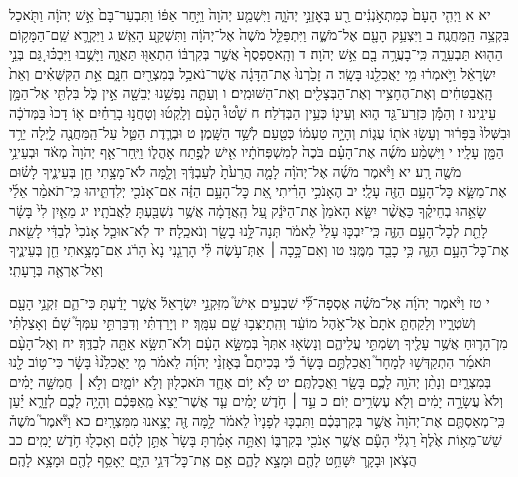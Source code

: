 \documentclass[twoside, openany, parskip=half, 11pt]{book}
\begin{document}
יא א וַיְהִ֤י הָעָם֙ כְּמִתְאֹ֣נְנִ֔ים רַ֖ע בְּאׇזְנֵ֣י יְהֹוָ֑ה וַיִּשְׁמַ֤ע יְהֹוָה֙ וַיִּ֣חַר אַפּ֔וֹ וַתִּבְעַר־בָּם֙ אֵ֣שׁ יְהֹוָ֔ה וַתֹּ֖אכַל בִּקְצֵ֥ה הַֽמַּחֲנֶֽה׃ ב וַיִּצְעַ֥ק הָעָ֖ם אֶל־מֹשֶׁ֑ה וַיִּתְפַּלֵּ֤ל מֹשֶׁה֙ אֶל־יְהֹוָ֔ה וַתִּשְׁקַ֖ע הָאֵֽשׁ׃ ג וַיִּקְרָ֛א שֵֽׁם־הַמָּק֥וֹם הַה֖וּא תַּבְעֵרָ֑ה כִּֽי־בָעֲרָ֥ה בָ֖ם אֵ֥שׁ יְהֹוָה׃ ד וְהָֽאסַפְסֻף֙ אֲשֶׁ֣ר בְּקִרְבּ֔וֹ הִתְאַוּ֖וּ תַּאֲוָ֑ה וַיָּשֻׁ֣בוּ וַיִּבְכּ֗וּ גַּ֚ם בְּנֵ֣י יִשְׂרָאֵ֔ל וַיֹּ֣אמְר֔וּ מִ֥י יַאֲכִלֵ֖נוּ בָּשָֽׂר׃ ה זָכַ֙רְנוּ֙ אֶת־הַדָּגָ֔ה אֲשֶׁר־נֹאכַ֥ל בְּמִצְרַ֖יִם חִנָּ֑ם אֵ֣ת הַקִּשֻּׁאִ֗ים וְאֵת֙ הָֽאֲבַטִּחִ֔ים וְאֶת־הֶחָצִ֥יר וְאֶת־הַבְּצָלִ֖ים וְאֶת־הַשּׁוּמִֽים׃ ו וְעַתָּ֛ה נַפְשֵׁ֥נוּ יְבֵשָׁ֖ה אֵ֣ין כֹּ֑ל בִּלְתִּ֖י אֶל־הַמָּ֥ן עֵינֵֽינוּ׃ ז וְהַמָּ֕ן כִּזְרַע־גַּ֖ד ה֑וּא וְעֵינ֖וֹ כְּעֵ֥ין הַבְּדֹֽלַח׃ ח שָׁ֩טוּ֩ הָעָ֨ם וְלָֽקְט֜וּ וְטָחֲנ֣וּ בָרֵחַ֗יִם א֤וֹ דָכוּ֙ בַּמְּדֹכָ֔ה וּבִשְּׁלוּ֙ בַּפָּר֔וּר וְעָשׂ֥וּ אֹת֖וֹ עֻג֑וֹת וְהָיָ֣ה טַעְמ֔וֹ כְּטַ֖עַם לְשַׁ֥ד הַשָּֽׁמֶן׃ ט וּבְרֶ֧דֶת הַטַּ֛ל עַל־הַֽמַּחֲנֶ֖ה לָ֑יְלָה יֵרֵ֥ד הַמָּ֖ן עָלָֽיו׃ י וַיִּשְׁמַ֨ע מֹשֶׁ֜ה אֶת־הָעָ֗ם בֹּכֶה֙ לְמִשְׁפְּחֹתָ֔יו אִ֖ישׁ לְפֶ֣תַח אׇהֳל֑וֹ וַיִּֽחַר־אַ֤ף יְהֹוָה֙ מְאֹ֔ד וּבְעֵינֵ֥י מֹשֶׁ֖ה רָֽע׃ יא וַיֹּ֨אמֶר מֹשֶׁ֜ה אֶל־יְהֹוָ֗ה לָמָ֤ה הֲרֵעֹ֙תָ֙ לְעַבְדֶּ֔ךָ וְלָ֛מָּה לֹא־מָצָ֥תִי חֵ֖ן בְּעֵינֶ֑יךָ לָשׂ֗וּם אֶת־מַשָּׂ֛א כׇּל־הָעָ֥ם הַזֶּ֖ה עָלָֽי׃ יב הֶאָנֹכִ֣י הָרִ֗יתִי אֵ֚ת כׇּל־הָעָ֣ם הַזֶּ֔ה אִם־אָנֹכִ֖י יְלִדְתִּ֑יהוּ כִּֽי־תֹאמַ֨ר אֵלַ֜י שָׂאֵ֣הוּ בְחֵיקֶ֗ךָ כַּאֲשֶׁ֨ר יִשָּׂ֤א הָאֹמֵן֙ אֶת־הַיֹּנֵ֔ק עַ֚ל הָֽאֲדָמָ֔ה אֲשֶׁ֥ר נִשְׁבַּ֖עְתָּ לַאֲבֹתָֽיו׃ יג מֵאַ֤יִן לִי֙ בָּשָׂ֔ר לָתֵ֖ת לְכׇל־הָעָ֣ם הַזֶּ֑ה כִּֽי־יִבְכּ֤וּ עָלַי֙ לֵאמֹ֔ר תְּנָה־לָּ֥נוּ בָשָׂ֖ר וְנֹאכֵֽלָה׃ יד לֹֽא־אוּכַ֤ל אָנֹכִי֙ לְבַדִּ֔י לָשֵׂ֖את אֶת־כׇּל־הָעָ֣ם הַזֶּ֑ה כִּ֥י כָבֵ֖ד מִמֶּֽנִּי׃ טו וְאִם־כָּ֣כָה ׀ אַתְּ־עֹ֣שֶׂה לִּ֗י הׇרְגֵ֤נִי נָא֙ הָרֹ֔ג אִם־מָצָ֥אתִי חֵ֖ן בְּעֵינֶ֑יךָ וְאַל־אֶרְאֶ֖ה בְּרָעָתִֽי׃

י טז וַיֹּ֨אמֶר יְהֹוָ֜ה אֶל־מֹשֶׁ֗ה אֶסְפָה־לִּ֞י שִׁבְעִ֣ים אִישׁ֮ מִזִּקְנֵ֣י יִשְׂרָאֵל֒ אֲשֶׁ֣ר יָדַ֔עְתָּ כִּי־הֵ֛ם זִקְנֵ֥י הָעָ֖ם וְשֹׁטְרָ֑יו וְלָקַחְתָּ֤ אֹתָם֙ אֶל־אֹ֣הֶל מוֹעֵ֔ד וְהִֽתְיַצְּב֥וּ שָׁ֖ם עִמָּֽךְ׃ יז וְיָרַדְתִּ֗י וְדִבַּרְתִּ֣י עִמְּךָ֮ שָׁם֒ וְאָצַלְתִּ֗י מִן־הָר֛וּחַ אֲשֶׁ֥ר עָלֶ֖יךָ וְשַׂמְתִּ֣י עֲלֵיהֶ֑ם וְנָשְׂא֤וּ אִתְּךָ֙ בְּמַשָּׂ֣א הָעָ֔ם וְלֹא־תִשָּׂ֥א אַתָּ֖ה לְבַדֶּֽךָ׃ יח וְאֶל־הָעָ֨ם תֹּאמַ֜ר הִתְקַדְּשׁ֣וּ לְמָחָר֮ וַאֲכַלְתֶּ֣ם בָּשָׂר֒ כִּ֡י בְּכִיתֶם֩ בְּאׇזְנֵ֨י יְהֹוָ֜ה לֵאמֹ֗ר מִ֤י יַאֲכִלֵ֙נוּ֙ בָּשָׂ֔ר כִּי־ט֥וֹב לָ֖נוּ בְּמִצְרָ֑יִם וְנָתַ֨ן יְהֹוָ֥ה לָכֶ֛ם בָּשָׂ֖ר וַאֲכַלְתֶּֽם׃ יט לֹ֣א י֥וֹם אֶחָ֛ד תֹּאכְל֖וּן וְלֹ֣א יוֹמָ֑יִם וְלֹ֣א ׀ חֲמִשָּׁ֣ה יָמִ֗ים וְלֹא֙ עֲשָׂרָ֣ה יָמִ֔ים וְלֹ֖א עֶשְׂרִ֥ים יֽוֹם׃ כ עַ֣ד ׀ חֹ֣דֶשׁ יָמִ֗ים עַ֤ד אֲשֶׁר־יֵצֵא֙ מֵֽאַפְּכֶ֔ם וְהָיָ֥ה לָכֶ֖ם לְזָרָ֑א יַ֗עַן כִּֽי־מְאַסְתֶּ֤ם אֶת־יְהֹוָה֙ אֲשֶׁ֣ר בְּקִרְבְּכֶ֔ם וַתִּבְכּ֤וּ לְפָנָיו֙ לֵאמֹ֔ר לָ֥מָּה זֶּ֖ה יָצָ֥אנוּ מִמִּצְרָֽיִם׃ כא וַיֹּ֘אמֶר֮ מֹשֶׁה֒ שֵׁשׁ־מֵא֥וֹת אֶ֙לֶף֙ רַגְלִ֔י הָעָ֕ם אֲשֶׁ֥ר אָנֹכִ֖י בְּקִרְבּ֑וֹ וְאַתָּ֣ה אָמַ֗רְתָּ בָּשָׂר֙ אֶתֵּ֣ן לָהֶ֔ם וְאָכְל֖וּ חֹ֥דֶשׁ יָמִֽים׃ כב הֲצֹ֧אן וּבָקָ֛ר יִשָּׁחֵ֥ט לָהֶ֖ם וּמָצָ֣א לָהֶ֑ם אִ֣ם אֶֽת־כׇּל־דְּגֵ֥י הַיָּ֛ם יֵאָסֵ֥ף לָהֶ֖ם וּמָצָ֥א לָהֶֽם׃
\end{document}
